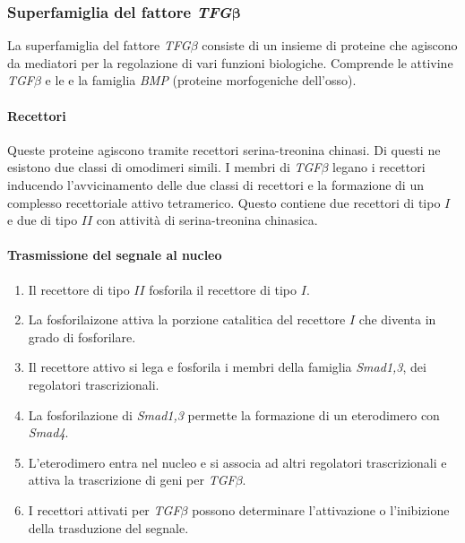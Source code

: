 		\subsubsection{Superfamiglia del fattore \emph{TFG$\mathbf{\beta}$}}
		La superfamiglia del fattore \emph{TFG$\beta$} consiste di un insieme di proteine che agiscono da mediatori per la regolazione di vari funzioni biologiche.
		Comprende le attivine \emph{TGF$\beta$} e le e la famiglia \emph{BMP} (proteine morfogeniche dell'osso).

			\paragraph{Recettori}
			Queste proteine agiscono tramite recettori serina-treonina chinasi.
			Di questi ne esistono due classi di omodimeri simili.
			I membri di \emph{TGF$\beta$} legano i recettori inducendo l'avvicinamento delle due classi di recettori e la formazione di un complesso recettoriale attivo tetramerico.
			Questo contiene due recettori di tipo $I$ e due di tipo $II$ con attivit\`a di serina-treonina chinasica.

			\paragraph{Trasmissione del segnale al nucleo}
			\begin{multicols}{2}
				\begin{enumerate}
					\item Il recettore di tipo $II$ fosforila il recettore di tipo $I$.
					\item La fosforilaizone attiva la porzione catalitica del recettore $I$ che diventa in grado di fosforilare.
					\item Il recettore attivo si lega e fosforila i membri della famiglia \emph{Smad1,3}, dei regolatori trascrizionali.
					\item La fosforilazione di \emph{Smad1,3} permette la formazione di un eterodimero con \emph{Smad4}.
					\item L'eterodimero entra nel nucleo e si associa ad altri regolatori trascrizionali e attiva la trascrizione di geni per \emph{TGF$\beta$}.
					\item I recettori attivati per \emph{TGF$\beta$} possono determinare l'attivazione o l'inibizione della trasduzione del segnale.
				\end{enumerate}
			\end{multicols}

